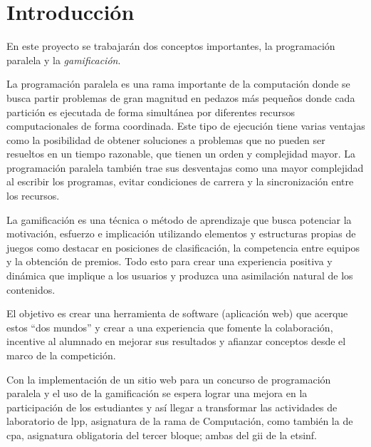 \documentclass[11pt,spanish,listoffigures,listoftables]{tfgetsinf}
\begin{document}
\begin{abstract}[english]

... \par

... \par

... \par

\end{abstract}

\mainmatter

\chapter{Introducción}

En este proyecto se trabajarán dos conceptos importantes, la programación paralela y la \textit{gamificación}. \par

La programación paralela es una rama importante de la computación donde se busca partir problemas de gran magnitud en pedazos más pequeños donde cada partición es ejecutada de forma simultánea por diferentes recursos computacionales de forma coordinada. Este tipo de ejecución tiene varias ventajas como la posibilidad de obtener soluciones a problemas que no pueden ser resueltos en un tiempo razonable, que tienen un orden y complejidad mayor. La programación paralela también trae sus desventajas como una mayor complejidad al escribir los programas, evitar condiciones de carrera y la sincronización entre los recursos. \par

La gamificación es una técnica o método de aprendizaje que busca potenciar la motivación, esfuerzo e implicación utilizando elementos y estructuras propias de juegos como destacar en posiciones de clasificación, la competencia entre equipos y la obtención de premios. Todo esto para crear una experiencia positiva y dinámica que implique a los usuarios y produzca una asimilación natural de los contenidos. \par

El objetivo es crear una herramienta de software (aplicación web) que acerque estos ``dos mundos'' y crear a una experiencia que fomente la colaboración, incentive al alumnado en mejorar sus resultados y afianzar conceptos desde el marco de la competición.

Con la implementación de un sitio web para un concurso de programación paralela y el uso de la gamificación se espera lograr una mejora en la participación de los estudiantes y así llegar a transformar las actividades de laboratorio de \acrfull{lpp}, asignatura de la rama de Computación, como también la de \acrfull{cpa}, asignatura obligatoria del tercer bloque; ambas del \acrfull{gii} de la \acrfull{etsinf}. \par
\end{document}
